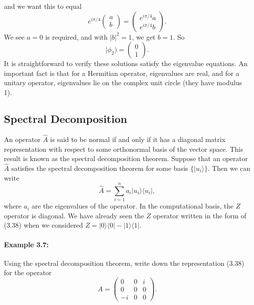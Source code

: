 \documentclass{article}
\begin{document}
and we want this to equal
\[
e^{i\pi/4}
\begin{pmatrix}
a\\
b
\end{pmatrix}
=
\begin{pmatrix}
e^{i\pi/4} a\\
e^{i\pi/4} b
\end{pmatrix}.
\]
We see \(a = 0\) is required, and with \(|b|^2 = 1\), we get \(b = 1\). So
\[
|\phi_2) = 
\begin{pmatrix}
0\\
1
\end{pmatrix}.
\]
It is straightforward to verify these solutions satisfy the eigenvalue equations. An important fact is that for a Hermitian operator, eigenvalues are real, and for a unitary operator, eigenvalues lie on the complex unit circle (they have modulus 1).

\subsection{Spectral Decomposition}

An operator \(\hat{A}\) is said to be normal if and only if it has a diagonal matrix representation with respect to some orthonormal basis of the vector space. This result is known as the spectral decomposition theorem. Suppose that an operator \(\hat{A}\) satisfies the spectral decomposition theorem for some basis \(\{|u_i\rangle\}\). Then we can write
\[
\hat{A}
= \sum_{i=1}^n a_i |u_i\rangle\langle u_i|,
\tag{3.38}
\]
where \(a_i\) are the eigenvalues of the operator. In the computational basis, the \(Z\) operator is diagonal. We have already seen the \(Z\) operator written in the form of (3.38) when we considered \(Z = |0\rangle\langle 0| - |1\rangle\langle 1|\).

\paragraph{Example 3.7:}
Using the spectral decomposition theorem, write down the representation (3.38) for the operator
\[
A
= \begin{pmatrix}
0 & 0 & i \\
0 & 0 & 0 \\
-i & 0 & 0
\end{pmatrix}.
\]
\end{document}
